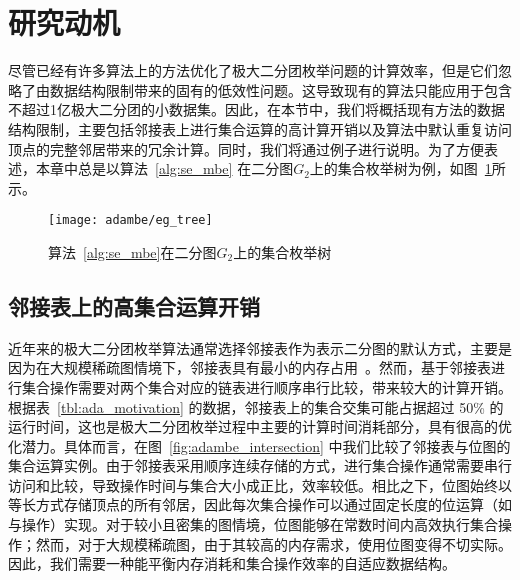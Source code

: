 \section{研究动机}

尽管已经有许多算法上的方法优化了极大二分团枚举问题的计算效率，但是它们忽略了由数据结构限制带来的固有的低效性问题。这导致现有的算法只能应用于包含不超过1亿极大二分团的小数据集。因此，在本节中，我们将概括现有方法的数据结构限制，主要包括邻接表上进行集合运算的高计算开销以及算法中默认重复访问顶点的完整邻居带来的冗余计算。同时，我们将通过例子进行说明。为了方便表述，本章中总是以算法~\ref{alg:se_mbe} 在二分图$G_2$上的集合枚举树为例，如图~\ref{fig:ada_tree}所示。

\begin{figure} [t]
	\centering
	\texttt{[image: adambe/eg\_tree]}
  \vspace{0.05in}
	\caption{算法~\ref{alg:se_mbe}在二分图$G_2$上的集合枚举树}

	\label{fig:ada_tree}
\end{figure}

\subsection{邻接表上的高集合运算开销}

近年来的极大二分团枚举算法通常选择邻接表作为表示二分图的默认方式，主要是因为在大规模稀疏图情境下，邻接表具有最小的内存占用~\cite{PMBE20,ooMBE22}。然而，基于邻接表进行集合操作需要对两个集合对应的链表进行顺序串行比较，带来较大的计算开销。根据表~\ref{tbl:ada_motivation} 的数据，邻接表上的集合交集可能占据超过 50\% 的运行时间，这也是极大二分团枚举过程中主要的计算时间消耗部分，具有很高的优化潜力。具体而言，在图~\ref{fig:adambe_intersection} 中我们比较了邻接表与位图的集合运算实例。由于邻接表采用顺序连续存储的方式，进行集合操作通常需要串行访问和比较，导致操作时间与集合大小成正比，效率较低。相比之下，位图始终以等长方式存储顶点的所有邻居，因此每次集合操作可以通过固定长度的位运算（如与操作）实现。对于较小且密集的图情境，位图能够在常数时间内高效执行集合操作；然而，对于大规模稀疏图，由于其较高的内存需求，使用位图变得不切实际。因此，我们需要一种能平衡内存消耗和集合操作效率的自适应数据结构。


